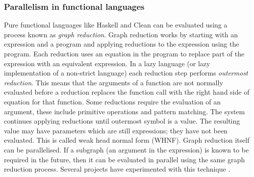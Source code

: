 
\subsubsection{Parallelism in functional languages}
\label{sec:intro_par_func}


Pure functional languages like Haskell and Clean can be evaluated using a
process known as \emph{graph reduction}.
Graph reduction works by starting with an expression and a program and
applying reductions to the expression using the program.
Each reduction uses an equation in the program to replace part of the
expression with an equivalent expression.
In a lazy language (or lazy implementation of a non-strict language)
each reduction step performs \emph{outermost reduction}.
This means that the arguments of a function are not normally evaluated
before a reduction replaces the function call with the right hand side of
equation for that function.
Some reductions require the evaluation of an argument,
these include primitive operations and pattern matching.
The system continues applying reductions until outermost symbol is a value.
The resulting value may have parameters which are still expressions;
they have not been evaluated.
This is called weak head normal form (WHNF).
Graph reduction itself can be parallelised.
If a subgraph (an argument in the expression) is known to be required in the
future,
then it can be evaluated in parallel using the same graph reduction process.
Several projects have experimented with this technique
\citep{augustsson:1989:parallel-graph-reduction,burn:1989:parallel-reduction-machine,peyton-jones:1989:parallel-graph-reduction}.

